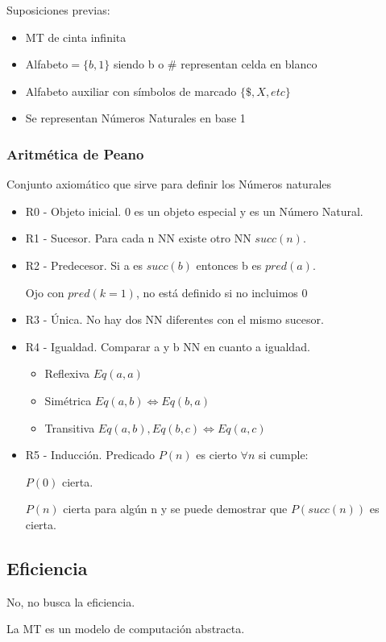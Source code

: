 Suposiciones previas:
\begin{itemize}
    \item MT de cinta infinita
    \item Alfabeto$=\{b,1\}$ siendo b o $\#$ representan celda en blanco
    \item Alfabeto auxiliar con símbolos de marcado $\{\$, X, etc\}$
    \item Se representan Números Naturales en base 1
\end{itemize}

\subsubsection{Aritmética de Peano} 
Conjunto axiomático que sirve para definir los Números naturales
\begin{itemize}
    \item R0 - Objeto inicial. 0 es un objeto especial y es un Número Natural.
    \item R1 - Sucesor. Para cada n NN existe otro NN $succ(n)$.
    \item R2 - Predecesor. Si a es $succ(b)$ entonces b es $pred(a)$.
    
    Ojo con $pred(k=1)$, no está definido si no incluimos 0
    \item R3 - Única. No hay dos NN diferentes con el mismo sucesor.
    \item R4 - Igualdad. Comparar a y b NN en cuanto a igualdad.
    \begin{itemize}
        \item Reflexiva $Eq(a,a)$
        \item Simétrica $Eq(a,b) \Leftrightarrow Eq(b,a)$
        \item Transitiva $Eq(a,b), Eq(b,c) \Leftrightarrow Eq(a,c)$
    \end{itemize}
    \item R5 - Inducción. Predicado $P(n)$ es cierto $\forall n$ si cumple: 
    
    $P(0)$ cierta.
    
    $P(n)$ cierta para algún n y se puede demostrar que $P(succ(n))$ es cierta.
\end{itemize}

\subsection{Eficiencia}
No, no busca la eficiencia.

La MT es un modelo de computación abstracta.

